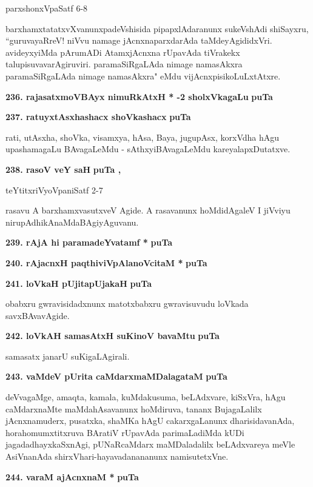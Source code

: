 \hfill{parxshonxVpaSatf 6-8}

\smallskip
barxhamxtatatxvXvanunxpadeVshisida pipapxlAdaranunx sukeVshAdi shiSayxru, ``guruvayaRreV! niVvu namage jAcnxna\-parxda\-rAda taMdeyAgididxVri. avideyxyiMda pArumADi AtamxjAcnxna rUpavAda tiVrakekx talupisuvava\-rAgiru\-viri. paramaSiRgaLAda nimage namasAkxra paramaSiRgaLAda nimage namasAkxra" eMdu vijAcnxpisi\-koLuLx\-tAtxre.

\medskip
\noindent
\textbf{236. rajasatxmoVBAyx nimuRkAtxH * -2 sholxVkagaLu} \hfill{\bf puTa \pageref{135}}

\medskip
\noindent
\textbf{237. ratuyxtAsxhashacx shoVkashacx} \hfill{\bf puTa \pageref{230}}

\smallskip
rati, utAsxha, shoVka, visamxya, hAsa, Baya, jugupAsx, korxVdha hAgu upashamagaLu BAvagaLeMdu - sAthxyiBAvagaLeMdu kareyalapxDutatxve.

\medskip
\noindent
\textbf{238. rasoV veY saH} \hfill{\bf puTa \pageref{223}, \pageref{231}}

\hfill{teYtitxriVyoVpaniSatf 2-7}

\smallskip
rasavu A barxhamxvasutxveV Agide. A rasavanunx hoMdidAgaleV I jiVviyu nirupAdhikAnaMda\-BAgi\-yAguvanu.

\medskip
\noindent
\textbf{239. rAjA hi paramadeYvatamf *} \hfill{\bf puTa \pageref{93}}

\medskip
\noindent
\textbf{240. rAjacnxH paqthiviVpAlanoVcitaM *} \hfill{\bf puTa \pageref{94}}

\medskip
\noindent
\textbf{241. loVkaH pUjitapUjakaH} \hfill{\bf puTa \pageref{183}}

\smallskip
obabxru gwravisidadxnunx matotxbabxru gwravisuvudu loVkada savxBAvavAgide.

\medskip
\noindent
\textbf{242. loVkAH samasAtxH suKinoV bavaMtu} \hfill{\bf puTa \pageref{47}}

\smallskip
samasatx janarU suKigaLAgirali.

\medskip
\noindent
\textbf{243. vaMdeV pUrita caMdarxmaMDalagataM} \hfill{\bf puTa \pageref{102}}

\smallskip
deVvagaMge, amaqta, kamala, kuMdakusuma, beLAdxvare, kiSxVra, hAgu caMdarxnaMte maMdahAsa\-vanunx hoMdiruva, tananx BujagaLalilx jAcnxnamuderx, pusatxka, shaMKa hAgU cakarxgaLanunx dharisidavanAda, hora\-homumxtitxruva BAratiV rUpavAda parimaLadiMda kUDi jagadadhayxkaSxnAgi, pUNaRcaMdarx maMDaladalilx beLAdxvareya meVle AsiVnanAda shirxVhari-hayavadanananunx namisutetxVne.

\medskip
\noindent
\textbf{244. varaM ajAcnxnaM *} \hfill{\bf puTa \pageref{94}}

